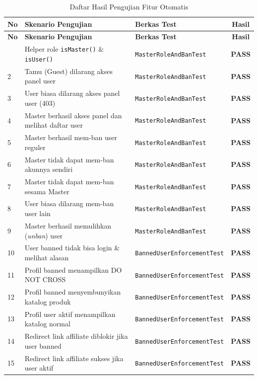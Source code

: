 \documentclass[12pt,a4paper]{article}
\begin{document}
\begin{longtable}{p{0.5cm}p{6.8cm}p{4.5cm}c}
\caption{Daftar Hasil Pengujian Fitur Otomatis} \label{tab:tests} \\
\toprule
\textbf{No} & \textbf{Skenario Pengujian} & \textbf{Berkas Test} & \textbf{Hasil} \\
\midrule
\endfirsthead
\toprule
\textbf{No} & \textbf{Skenario Pengujian} & \textbf{Berkas Test} & \textbf{Hasil} \\
\midrule
\endhead
\bottomrule
\endfoot
1 & Helper role \texttt{isMaster()} \& \texttt{isUser()} & \texttt{MasterRoleAndBanTest} & \textbf{PASS} \\
2 & Tamu (Guest) dilarang akses panel user & \texttt{MasterRoleAndBanTest} & \textbf{PASS} \\
3 & User biasa dilarang akses panel user (403) & \texttt{MasterRoleAndBanTest} & \textbf{PASS} \\
4 & Master berhasil akses panel dan melihat daftar user & \texttt{MasterRoleAndBanTest} & \textbf{PASS} \\
5 & Master berhasil mem-ban user reguler & \texttt{MasterRoleAndBanTest} & \textbf{PASS} \\
6 & Master tidak dapat mem-ban akunnya sendiri & \texttt{MasterRoleAndBanTest} & \textbf{PASS} \\
7 & Master tidak dapat mem-ban sesama Master & \texttt{MasterRoleAndBanTest} & \textbf{PASS} \\
8 & User biasa dilarang mem-ban user lain & \texttt{MasterRoleAndBanTest} & \textbf{PASS} \\
9 & Master berhasil memulihkan (\textit{unban}) user & \texttt{MasterRoleAndBanTest} & \textbf{PASS} \\
10 & User banned tidak bisa login \& melihat alasan & \texttt{BannedUserEnforcementTest} & \textbf{PASS} \\
11 & Profil banned menampilkan DO NOT CROSS & \texttt{BannedUserEnforcementTest} & \textbf{PASS} \\
12 & Profil banned menyembunyikan katalog produk & \texttt{BannedUserEnforcementTest} & \textbf{PASS} \\
13 & Profil user aktif menampilkan katalog normal & \texttt{BannedUserEnforcementTest} & \textbf{PASS} \\
14 & Redirect link affiliate diblokir jika user banned & \texttt{BannedUserEnforcementTest} & \textbf{PASS} \\
15 & Redirect link affiliate sukses jika user aktif & \texttt{BannedUserEnforcementTest} & \textbf{PASS} \\

\end{longtable}
\end{document}
